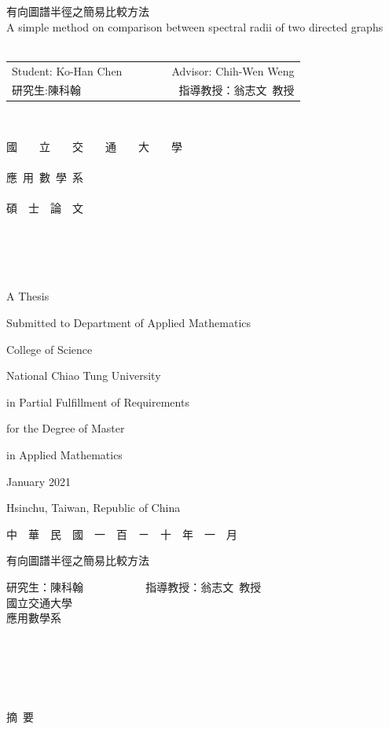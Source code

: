 \documentclass[12pt, a4paper]{article}
\theoremstyle{plain}
\theoremstyle{definition}
\begin{document}
\renewcommand{\baselinestretch}{2} %
\thispagestyle{empty}
\begin{center}
{
\Large
有向圖譜半徑之簡易比較方法\\
A simple method on comparison between spectral radii of two directed graphs\\~\\
\begin{tabular}{lccr}
Student: Ko-Han Chen  &&~~~& Advisor: Chih-Wen Weng\\
研究生:陳科翰　 &&~~~& 指導教授：翁志文~教授
\end{tabular}
}~\\

\bigskip

\renewcommand{\baselinestretch}{1} %

{ \LARGE 國~~~~立~~~~交~~~~通~~~~大~~~~學}\\~\\
{ \LARGE 應~用~數~學~系}\\~\\
{ \LARGE 碩~~士~~論~~文}\\~\\~\\~\\~\\
\renewcommand{\baselinestretch}{1} %
{ \large A Thesis

Submitted to Department of Applied Mathematics

College of Science

National Chiao Tung University

in Partial Fulfillment of Requirements

for the Degree of Master

in Applied Mathematics
\bigskip \medskip

January 2021

Hsinchu, Taiwan, Republic of China \bigskip \medskip

 中~~華~~民~~國~~一~~百~~ㄧ~~十~~年~~一~~月 }
\end{center}
\pagebreak

\label{abstract}

\begin{center}
{  \LARGE
有向圖譜半徑之簡易比較方法
\bigskip\bigskip\bigskip

研究生：陳科翰  ~~~~~~~~~~ 指導教授：翁志文~教授 \\
國立交通大學  \\
\bigskip
應用數學系
\bigskip\bigskip\bigskip\bigskip
} \\~\\~\\~\\
{\large 摘~要}
\end{center}
 \bigskip
\end{document}
